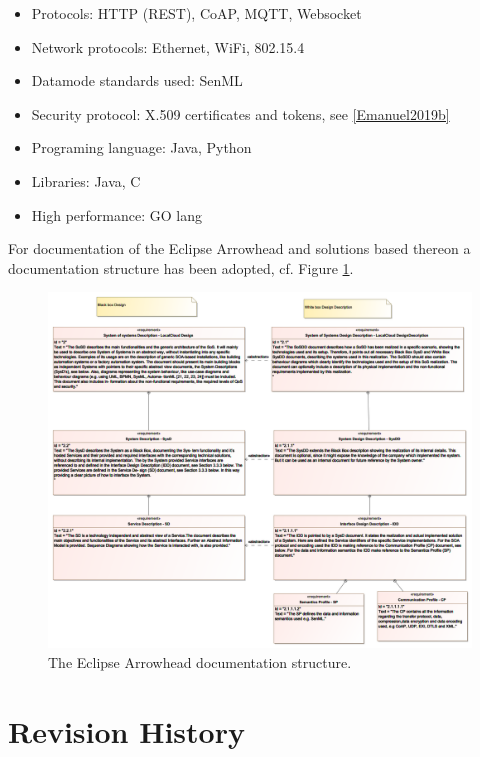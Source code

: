 \documentclass[a4paper]{arrowhead}
\begin{document}
\begin{itemize}      
    \item Protocols: HTTP (REST), CoAP, MQTT, Websocket
    \item Network protocols: Ethernet, WiFi, 802.15.4
    \item Datamode standards used: SenML
    \item Security protocol: X.509 certificates and tokens, see \ref{Emanuel2019b}
    \item Programing language: Java, Python
    \item Libraries: Java, C
    \item High performance: GO lang
\end{itemize}  
 
For documentation of the Eclipse Arrowhead and solutions based thereon
a documentation structure has been adopted, cf. Figure \ref{fig:documentation_structure}.  
  
\begin{figure}[ht!]
   \centering
   \includegraphics[width=0.9\linewidth]{figures/documentation_structure}
   \caption{The Eclipse Arrowhead documentation structure.}
   \label{fig:documentation_structure}
 \end{figure}









\newpage

\section{Revision History}
\end{document}

